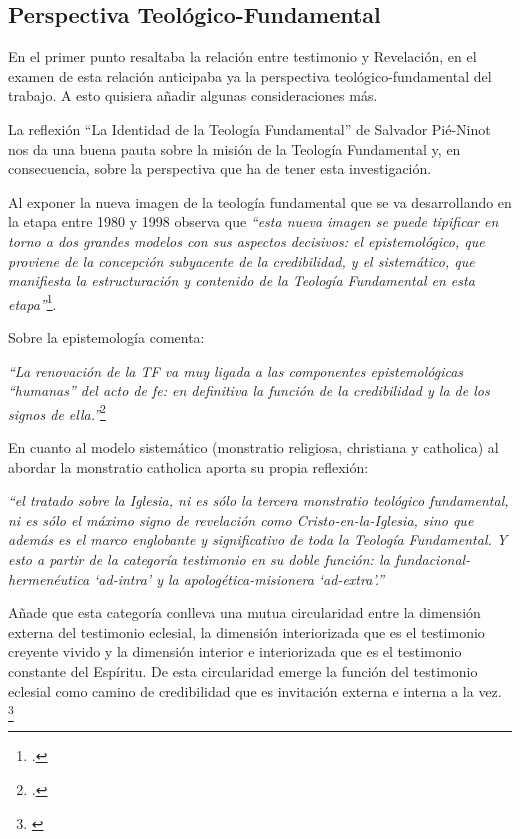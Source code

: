 \documentclass[11pt]{article}
\begin{document}
\subsection{Perspectiva Teológico-Fundamental}

En el primer punto resaltaba la relación entre testimonio y Revelación, en el examen de esta relación anticipaba ya la perspectiva teológico-fundamental del trabajo. A esto quisiera añadir algunas consideraciones más.

La reflexión ``La Identidad de la Teología Fundamental'' de Salvador Pié-Ninot nos da una buena pauta sobre la misión de la Teología Fundamental y, en consecuencia, sobre la perspectiva que ha de tener esta investigación. 

Al exponer la nueva imagen de la teología fundamental que se va desarrollando en la etapa entre 1980 y 1998 observa que \emph{``esta nueva imagen se puede tipificar en torno a dos grandes modelos con sus aspectos decisivos: el epistemológico, que proviene de la concepción subyacente de la credibilidad, y el sistemático, que manifiesta la estructuración y contenido de la Teología Fundamental en esta etapa''}\footcite[29]{ninotTF}.

Sobre la epistemología comenta:

\emph{
``La renovación de la TF va muy ligada a las componentes epistemológicas ``humanas'' del acto de fe: en definitiva la función de la credibilidad y la de los signos de ella.''}\footcite[31]{ninotTF}

En cuanto al modelo sistemático (monstratio religiosa, christiana y catholica) al abordar la monstratio catholica aporta su propia reflexión:

\emph{
``el tratado sobre la Iglesia, ni es sólo la tercera monstratio teológico fundamental, ni es sólo el máximo signo de revelación como Cristo-en-la-Iglesia, sino que además es el marco englobante y significativo de toda la Teología Fundamental. Y esto a partir de la categoría testimonio en su doble función: la fundacional-hermenéutica `ad-intra' y la apologética-misionera `ad-extra'.''}

Añade que esta categoría conlleva una mutua circularidad entre la dimensión externa del testimonio eclesial, la dimensión interiorizada que es el testimonio creyente vivido y la dimensión interior e interiorizada que es el testimonio constante del Espíritu. De esta circularidad emerge la función del testimonio eclesial como camino de credibilidad que es invitación externa e interna a la vez. \footnote{\cite[40]{ninotTF}}
\end{document}
